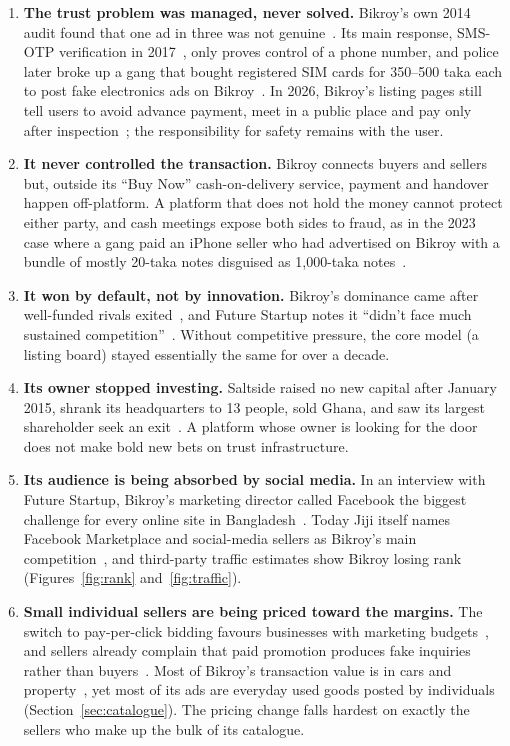 \documentclass[11pt,a4paper]{article}
\begin{document}
\begin{enumerate}[label=\textbf{\arabic*.}]
  \item \textbf{The trust problem was managed, never solved.} Bikroy's own 2014 audit found
  that one ad in three was not genuine~\cite{dt_2014}. Its main response, SMS-OTP
  verification in 2017~\cite{fs_fraud}, only proves control of a phone number, and police
  later broke up a gang that bought registered SIM cards for 350--500 taka each to post
  fake electronics ads on Bikroy~\cite{ds_muktagacha}. In 2026, Bikroy's listing pages
  still tell users to avoid advance payment, meet in a public place and pay only after
  inspection~\cite{bikroy_listing}; the responsibility for safety remains with the user.

  \item \textbf{It never controlled the transaction.} Bikroy connects buyers and sellers
  but, outside its ``Buy Now'' cash-on-delivery service, payment and handover happen
  off-platform. A platform that does not hold the money cannot protect either party, and
  cash meetings expose both sides to fraud, as in the 2023 case where a gang paid an
  iPhone seller who had advertised on Bikroy with a bundle of mostly 20-taka notes
  disguised as 1{,}000-taka notes~\cite{pa_2023}.

  \item \textbf{It won by default, not by innovation.} Bikroy's dominance came after
  well-funded rivals exited~\cite{fs_ekhanei}, and Future Startup notes it ``didn't face
  much sustained competition''~\cite{fs_jiji}. Without competitive pressure, the core
  model (a listing board) stayed essentially the same for over a decade.

  \item \textbf{Its owner stopped investing.} Saltside raised no new capital after January
  2015, shrank its headquarters to 13 people, sold Ghana, and saw its largest shareholder
  seek an exit~\cite{fs_jiji}. A platform whose owner is looking for the door does not make
  bold new bets on trust infrastructure.

  \item \textbf{Its audience is being absorbed by social media.} In an interview with Future Startup, Bikroy's
  marketing director called Facebook the biggest challenge for every online site in
  Bangladesh~\cite{fs_misha}. Today Jiji itself names Facebook Marketplace and
  social-media sellers as Bikroy's main competition~\cite{fs_jiji}, and third-party
  traffic estimates show Bikroy losing rank (Figures~\ref{fig:rank} and~\ref{fig:traffic}).

  \item \textbf{Small individual sellers are being priced toward the margins.} The switch
  to pay-per-click bidding favours businesses with marketing budgets~\cite{fs_jiji}, and
  sellers already complain that paid promotion produces fake inquiries rather than
  buyers~\cite{trustpilot}. Most of Bikroy's transaction value is in cars and
  property~\cite{fs_jiji}, yet most of its ads are everyday used goods posted by individuals
  (Section~\ref{sec:catalogue}). The pricing change falls hardest on exactly the sellers who
  make up the bulk of its catalogue.
\end{enumerate}
\end{document}
